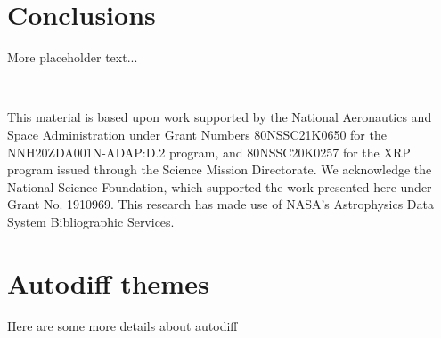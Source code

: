 \documentclass[modern]{aastex631}
\begin{document}
\section{Conclusions}
More placeholder text...


\

\begin{acknowledgements}
    This material is based upon work supported by the National Aeronautics and Space Administration under Grant Numbers 80NSSC21K0650 for the NNH20ZDA001N-ADAP:D.2 program, and 80NSSC20K0257 for the XRP program issued through the Science Mission Directorate.  We acknowledge the National Science Foundation, which supported the work presented here under Grant No. 1910969.  This research has made use of NASA's Astrophysics Data System Bibliographic Services.
\end{acknowledgements}

\clearpage








\clearpage

\appendix
\restartappendixnumbering

\section{Autodiff themes} \label{appendix:tools}

Here are some more details about autodiff
\end{document}

